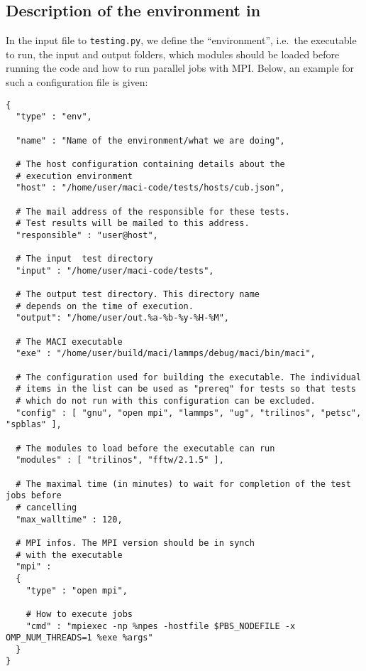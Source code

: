\subsection{Description of the environment in \JSON}

In the input file to \lstinline[style=SHELL]|testing.py|, we define the ``environment'', i.e.~the executable to run, the input and output folders, which modules should be loaded before running the code and how to run parallel jobs with MPI. Below, an example for such a configuration file is given:

\begin{lstlisting}[style=SHELL_SMALL,frame=lines]
{
  "type" : "env",
  
  "name" : "Name of the environment/what we are doing",

  # The host configuration containing details about the
  # execution environment
  "host" : "/home/user/maci-code/tests/hosts/cub.json",

  # The mail address of the responsible for these tests.
  # Test results will be mailed to this address.
  "responsible" : "user@host",

  # The input  test directory
  "input" : "/home/user/maci-code/tests",
	
  # The output test directory. This directory name
  # depends on the time of execution.
  "output": "/home/user/out.%a-%b-%y-%H-%M",

  # The MACI executable
  "exe" : "/home/user/build/maci/lammps/debug/maci/bin/maci",

  # The configuration used for building the executable. The individual
  # items in the list can be used as "prereq" for tests so that tests
  # which do not run with this configuration can be excluded.
  "config" : [ "gnu", "open mpi", "lammps", "ug", "trilinos", "petsc", "spblas" ],
	
  # The modules to load before the executable can run
  "modules" : [ "trilinos", "fftw/2.1.5" ],

  # The maximal time (in minutes) to wait for completion of the test jobs before
  # cancelling
  "max_walltime" : 120,

  # MPI infos. The MPI version should be in synch
  # with the executable
  "mpi" :
  {
    "type" : "open mpi",

    # How to execute jobs
    "cmd" : "mpiexec -np %npes -hostfile $PBS_NODEFILE -x OMP_NUM_THREADS=1 %exe %args"
  }
}
\end{lstlisting}

